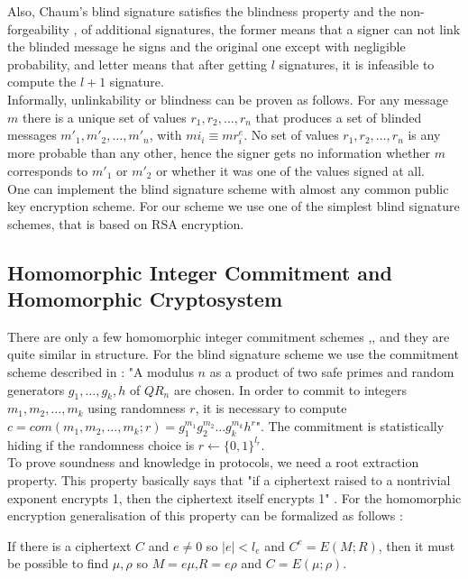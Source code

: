 Also, Chaum's blind signature satisfies the blindness property \cite{Chaum1982} and the non-forgeability \cite{Pointcheval1996},\cite{Abstract1997} of additional signatures, the former means that a signer can not  link the blinded message he signs and the original one except with negligible probability, and letter means that after getting $l$ signatures, it is infeasible to compute the $l+1$ signature.\\

Informally, unlinkability or blindness can be proven as follows. For any message $m$  there is a unique set of values $r_1,r_2,\dots,r_n$ that produces a set of blinded messages $m'_1,m'_2,\dots,m'_n$, with $mi_i  \equiv mr_i^e$. No set of values $r_1,r_2,\dots,r_n$ is any more probable than any other, hence the signer gets no information whether $m$ corresponds to $m'_1$ or $m'_2$ or whether it was one of the values signed at all.\\

One can implement the blind signature scheme with almost any common public key encryption scheme. For our scheme we use one of the simplest blind signature schemes, that is based on RSA encryption. 
\subsection{Homomorphic Integer Commitment and Homomorphic Cryptosystem}
There are only a few homomorphic integer commitment schemes \cite{Eiichiro1997},\cite{Damg},\cite{Groth2005a} and they are quite similar in structure. For the blind signature scheme  we use the commitment scheme described in  \cite{Groth2010}: "A modulus $n$ as a product of two safe primes and random generators $g_1, \dots, g_k,h$ of $QR_n$ are chosen. In order to commit to integers $m_1,m_2, \dots, m_k$ using randomness $r$, it is necessary to compute $c = com( m_1,m_2, \dots, m_k; r) = g_1^{m_1}g_2^{m_2}\dots g_k^{m_k}h^r$". The commitment is statistically hiding if the randomness choice is $r \leftarrow \{0,1\}^{l_r}$.\\

To prove soundness and knowledge in protocols, we need a root extraction property. This property basically says that "if a ciphertext raised to a nontrivial exponent encrypts 1, then the ciphertext itself encrypts 1" \cite{Groth2010}. For the homomorphic encryption generalisation of this property can be formalized as follows \cite{Groth2005}: \\
\begin{definition}
If there is a ciphertext $C$ and $e \neq  0$ so $|e| < l_e$ and $C^e = E(M;R)$, then it must be possible to find $\mu, \rho$ so $M = e\mu$,$R = e\rho$ and $C = E(\mu; \rho)$. 
\end{definition}

